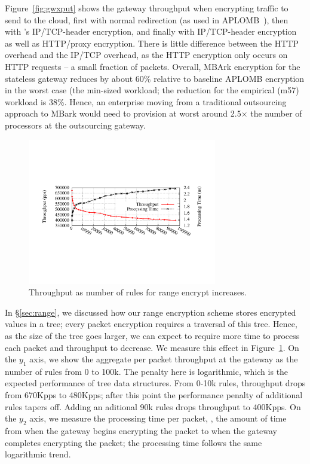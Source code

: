 Figure~\ref{fig:gwxput} shows the gateway throughput when encrypting traffic to send to the cloud, first with normal redirection (as used in APLOMB~\cite{aplomb}), then with \sys's IP/TCP-header encryption, and finally with IP/TCP-header encryption as well as HTTP/proxy encryption. There is little difference between the HTTP overhead and the IP/TCP overhead, as the HTTP encryption only occurs on HTTP requests -- a small fraction of packets. Overall, MBArk encryption for the stateless gateway reduces by about 60\% relative to baseline APLOMB encryption in the worst case (the min-sized workload; the reduction for the empirical (m57) workload is 38\%. Hence, an enterprise moving from a traditional outsourcing approach to MBark would need to provision at worst around 2.5$\times$ the number of processors at the outsourcing gateway.

\begin{figure}[t]
  \includegraphics[width=3.25in]{fig/xputrange}
  \vspace{-10pt}
  \caption[]{\label{fig:xputrange} Throughput as number of rules for range encrypt increases.}
\end{figure}

In \S\ref{sec:range}, we discussed how our range encryption scheme stores encrypted values in a tree; every packet encryption requires a traversal of this tree.
Hence, as the size of the tree goes larger, we can expect to require more time to process each packet and throughput to decrease.
We measure this effect in Figure~\ref{fig:xputrange}. 
On the $y_1$ axis, we show the aggregate per packet throughput at the gateway as the number of rules from 0 to 100k. The penalty here is logarithmic, which is the expected performance of tree data structures. From 0-10k rules, throughput drops from 670Kpps to 480Kpps; after this point the performance penalty of additional rules tapers off. Adding an aditional 90k rules drops throughput to 400Kpps.
On the $y_2$ axis, we measure the processing time per packet, \ie{}, the amount of time from when the gateway begins encrypting the packet to when the gateway completes encrypting the packet; the processing time follows the same logarithmic trend.

